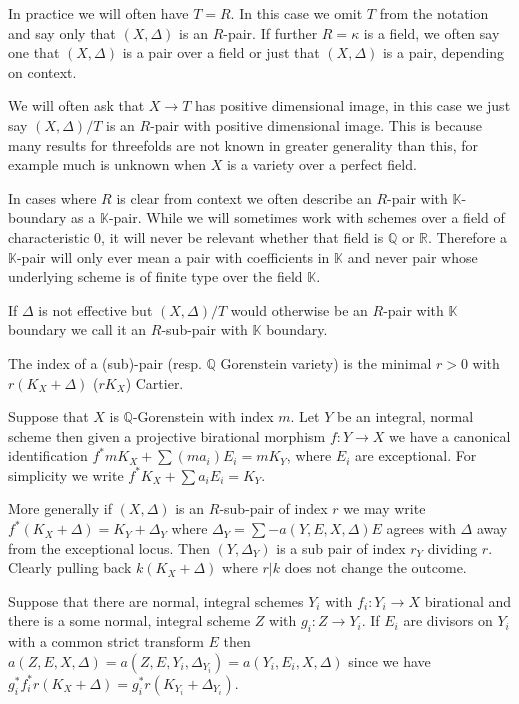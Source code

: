 \documentclass[a4paper,12pt]{book}
\begin{document}
In practice we will often have $T=R$. In this case we omit $T$ from the notation and say only that $(X,\Delta)$ is an $R$-pair. If further $R=\kappa$ is a field, we often say one that $(X,\Delta)$ is a pair over a field or just that $(X,\Delta)$ is a pair, depending on context.

We will often ask that $X \to T$ has positive dimensional image, in this case we just say $(X,\Delta)/T$ is an $R$-pair with positive dimensional image. This is because many results for threefolds are not known in greater generality than this, for example much is unknown when $X$ is a variety over a perfect field.

In cases where $R$ is clear from context we often describe an $R$-pair with $\mathbb{K}$-boundary as a $\mathbb{K}$-pair. While we will sometimes work with schemes over a field of characteristic $0$, it will never be relevant whether that field is $\mathbb{Q}$ or $\mathbb{R}$. Therefore a $\mathbb{K}$-pair will only ever mean a pair with coefficients in $\mathbb{K}$ and never pair whose underlying scheme is of finite type over the field $\mathbb{K}$. 

\begin{definition}
	If $\Delta$ is not effective but $(X,\Delta)/T$ would otherwise be an $R$-pair with $\mathbb{K}$ boundary we call it an $R$-sub-pair with $\mathbb{K}$ boundary.
	
	The index of a (sub)-pair (resp. $\mathbb{Q}$ Gorenstein variety) is the minimal $r>0$ with $r(K_{X}+\Delta)$ ($rK_{X}$) Cartier.
\end{definition}

Suppose that $X$ is $\mathbb{Q}$-Gorenstein with index $m$. Let $Y$ be an integral, normal scheme then given a projective birational morphism $f:Y \to X$ we have a canonical identification $f^{*}mK_{X}+\sum(ma_{i})E_{i}=mK_{Y}$, where $E_{i}$ are exceptional. For simplicity we write $f^{*}K_{X}+\sum a_{i}E_{i} =K_{Y}$.

More generally if $(X,\Delta)$ is an $R$-sub-pair of index $r$ we may write $f^{*}(K_{X}+\Delta)=K_{Y}+ \Delta_{Y}$ where $\Delta_{Y}=\sum -a(Y,E,X,\Delta)E$ agrees with $\Delta$ away from the exceptional locus. Then $(Y,\Delta_{Y})$ is a sub pair of index $r_{Y}$ dividing $r$. Clearly pulling back $k(K_{X}+\Delta)$ where $r|k$ does not change the outcome.

Suppose that there are normal, integral schemes $Y_{i}$ with $f_{i}:Y_{i} \to X$ birational and there is a some normal, integral scheme $Z$ with $g_{i}:Z\to Y_{i}$. If $E_{i}$ are divisors on $Y_{i}$ with a common strict transform $E$ then $a(Z,E,X,\Delta)=a(Z,E,Y_{i},\Delta_{Y_{i}})=a(Y_{i},E_{i},X,\Delta)$ since we have $g_{i}^{*}f_{i}^{*}r(K_{X}+\Delta)=g_{i}^{*}r(K_{Y_{i}}+\Delta_{Y_{i}})$.
\end{document}
